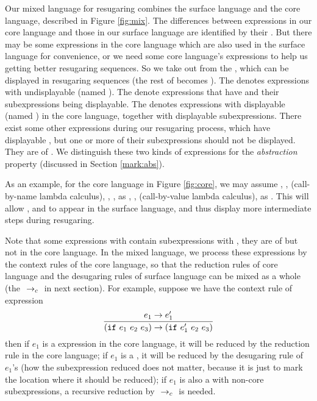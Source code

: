 Our mixed language for resugaring combines the surface language and the core language, described in Figure \ref{fig:mix}.
%
The differences between expressions in our core language and those in our surface language are identified by their . But there may be some expressions in the core language which are also used in the surface language for convenience, or we need some core language's expressions to help us getting better resugaring sequences. So we take  out from the , which can be displayed in resugaring sequences (the rest of  becomes ). The  denotes expressions with undisplayable  (named ). The  denote expressions that have  and their subexpressions being displayable. The  denotes expressions with displayable  (named ) in the core language, together with displayable subexpressions. There exist some other expressions during our resugaring process, which have displayable , but one or more of their subexpressions should not be displayed. They are of . We distinguish these two kinds of expressions for the \emph{abstraction} property (discussed in Section \ref{mark:abs}).

As an example, for the core language in Figure \ref{fig:core},
we may assume , ,  (call-by-name lambda calculus), , ,  as , ,  (call-by-value lambda calculus),  as . This will allow ,  and  to appear in the surface language, and thus display more intermediate steps during resugaring.

Note that some expressions with  contain subexpressions with , they are of  but not in the core language. In the mixed language, we process these expressions by the context rules of the core language, so that the reduction rules of core language and the desugaring rules of surface language can be mixed as a whole (the $~\rightarrow_c~$ in next section). For example, suppose we have the context rule of  expression
\[
\infer{(\m{if}~e_1~e_2~e_3) \rightarrow (\m{if}~e_1'~e_2~e_3)}{e_1 \rightarrow e_1'}
\]
then if $e_1$ is a expression in the core language, it will be reduced by the reduction rule in the core language; if $e_1$ is a , it will be reduced by the desugaring rule of $e_1$'s  (how the subexpression reduced does not matter, because it is just to mark the location where it should be reduced); if $e_1$ is also a  with non-core subexpressions, a recursive reduction by $~\rightarrow_c~$ is needed.


